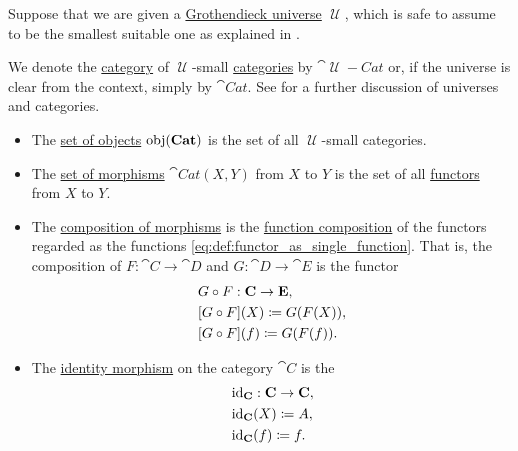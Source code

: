 \begin{definition}\label{def:category_of_small_categories}
  Suppose that we are given a \hyperref[def:grothendieck_universe]{Grothendieck universe} \( \mscrU \), which is safe to assume to be the smallest suitable one as explained in .

  We denote the \hyperref[def:category]{category} of \( \mscrU \)-small \hyperref[def:category]{categories} by \( \cat{\mscrU-Cat} \) or, if the universe is clear from the context, simply by \( \cat{Cat} \). See  for a further discussion of universes and categories.

  \begin{itemize}
    \item The \hyperref[def:category/objects]{set of objects} \( \operatorname{obj}(\operatorname{\mathbf{Cat}}) \) is the set of all \( \mscrU \)-small categories.

    \item The \hyperref[def:category/morphisms]{set of morphisms} \( \cat{Cat}(X, Y) \) from \( X \) to \( Y \) is the set of all \hyperref[def:functor]{functors} from \( X \) to \( Y \).

    \item The \hyperref[def:category/composition]{composition of morphisms} is the \hyperref[def:multi_valued_function/composition]{function composition} of the functors regarded as the functions \eqref{eq:def:functor_as_single_function}. That is, the composition of \( F: \cat{C} \to \cat{D} \) and \( G: \cat{D} \to \cat{E} \) is the functor
    \begin{equation}\label{eq:def:category_of_small_categories/composition}
      \begin{aligned}
        &G \mathbin \circ F: \operatorname{\mathbf{C}} \to \operatorname{\mathbf{E}}, \\
        &[G \mathbin \circ F](X) \coloneqq G(F(X)), \\
        &[G \mathbin \circ F](f) \coloneqq G(F(f)).
      \end{aligned}
    \end{equation}

    \item The \hyperref[def:category/identity]{identity morphism} on the category \( \cat{C} \) is the 
    \begin{equation}\label{eq:def:category_of_small_categories/identity}
      \begin{aligned}
        &\operatorname{id}_{\operatorname{\mathbf{C}}}: \operatorname{\mathbf{C}} \to \operatorname{\mathbf{C}}, \\
        &\operatorname{id}_{\operatorname{\mathbf{C}}}(X) \coloneqq A, \\
        &\operatorname{id}_{\operatorname{\mathbf{C}}}(f) \coloneqq f.
      \end{aligned}
    \end{equation}
  \end{itemize}
\end{definition}
